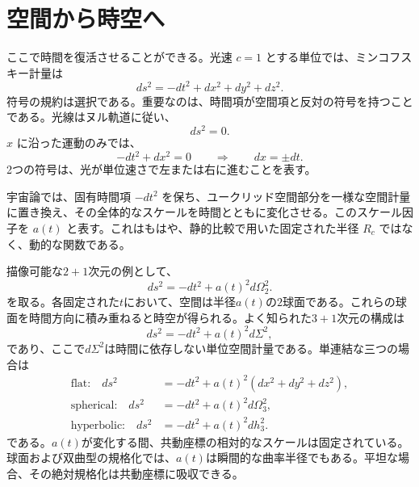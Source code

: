 \section{空間から時空へ}

ここで時間を復活させることができる。光速 \(c=1\) とする単位では、ミンコフスキー計量は
\begin{equation}
ds^2 = -dt^2 + dx^2 + dy^2 + dz^2.
\label{eq:c03-minkowski}
\end{equation}
符号の規約は選択である。重要なのは、時間項が空間項と反対の符号を持つことである。光線はヌル軌道に従い、
\begin{equation}
ds^2 = 0.
\end{equation}
\(x\) に沿った運動のみでは、
\begin{equation}
-dt^2 + dx^2 = 0
\qquad\Rightarrow\qquad
dx = \pm dt.
\label{eq:c03-null-flat}
\end{equation}
2つの符号は、光が単位速さで左または右に進むことを表す。

宇宙論では、固有時間項 \(-dt^2\) を保ち、ユークリッド空間部分を一様な空間計量に置き換え、その全体的なスケールを時間とともに変化させる。このスケール因子を \(a(t)\) と表す。これはもはや、静的比較で用いた固定された半径 \(R_c\) ではなく、動的な関数である。

描像可能な\(2+1\)次元の例として、
\begin{equation}
ds^2 = -dt^2 + a(t)^2 d\Omega_2^2.
\label{eq:c03-two-plus-one}
\end{equation}
を取る。各固定された\(t\)において、空間は半径\(a(t)\)の\(2\)球面である。これらの球面を時間方向に積み重ねると時空が得られる。よく知られた\(3+1\)次元の構成は
\begin{equation}
ds^2 = -dt^2 + a(t)^2 d\Sigma^2,
\label{eq:c03-frw-general}
\end{equation}
であり、ここで\(d\Sigma^2\)は時間に依存しない単位空間計量である。単連結な三つの場合は
\begin{align}
\text{flat:}\quad
ds^2&=-dt^2+a(t)^2\left(dx^2+dy^2+dz^2\right),\label{eq:c03-frw-flat}\\
\text{spherical:}\quad
ds^2&=-dt^2+a(t)^2d\Omega_3^2,\label{eq:c03-frw-spherical}\\
\text{hyperbolic:}\quad
ds^2&=-dt^2+a(t)^2dh_3^2.\label{eq:c03-frw-hyperbolic}
\end{align}
である。\(a(t)\)が変化する間、共動座標の相対的なスケールは固定されている。球面および双曲型の規格化では、\(a(t)\)は瞬間的な曲率半径でもある。平坦な場合、その絶対規格化は共動座標に吸収できる。

